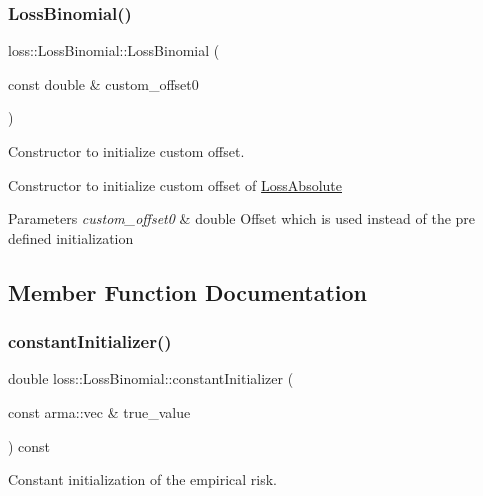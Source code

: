 \subsubsection{\texorpdfstring{Loss\+Binomial()}{LossBinomial()}\hspace{0.1cm}{\footnotesize\ttfamily [2/2]}}
{\footnotesize\ttfamily loss\+::\+Loss\+Binomial\+::\+Loss\+Binomial (\begin{DoxyParamCaption}\item[{const double \&}]{custom\+\_\+offset0 }\end{DoxyParamCaption})}



Constructor to initialize custom offset. 

Constructor to initialize custom offset of {\ttfamily \mbox{\hyperlink{classloss_1_1_loss_absolute}{Loss\+Absolute}}}


\begin{DoxyParams}{Parameters}
{\em custom\+\_\+offset0} & {\ttfamily double} Offset which is used instead of the pre defined initialization \\
\hline
\end{DoxyParams}


\subsection{Member Function Documentation}
\mbox{\label{classloss_1_1_loss_binomial_a21c384401aa0ef9b2db379e6822c3570}} 
\subsubsection{\texorpdfstring{constant\+Initializer()}{constantInitializer()}}
{\footnotesize\ttfamily double loss\+::\+Loss\+Binomial\+::constant\+Initializer (\begin{DoxyParamCaption}\item[{const arma\+::vec \&}]{true\+\_\+value }\end{DoxyParamCaption}) const\hspace{0.3cm}{\ttfamily [virtual]}}



Constant initialization of the empirical risk. 


